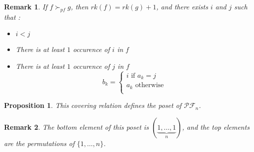 \documentclass[12pt]{report}
\newtheorem*{prop}{Proposition}
\newtheorem*{rem}{Remark}
\begin{document}
\begin{rem}
    If $f \succ_{pf} g$, then $rk(f) = rk(g) + 1$, and
    there exists $i$ and $j$ such that :
    \begin{itemize}
        \item $i < j$
        \item There is at least $1$ occurence of $i$ in $f$
        \item There is at least $1$ occurence of $j$ in $f$
        $$b_k =
            \begin{cases}
                i \text{ if } a_k = j\\
                a_k \text{ otherwise}\\
            \end{cases}$$
    \end{itemize}
\end{rem}

\begin{prop}
    This covering relation defines the \emph{poset}
    of $\mathcal{PF}_n$.
\end{prop}

\begin{rem}
    The bottom element of this poset is
    $(\underbrace{1, \ldots, 1}_{n})$,
    and the top elements are the \emph{permutations} of
    $\{1, \ldots, n\}$.
\end{rem}
\end{document}
